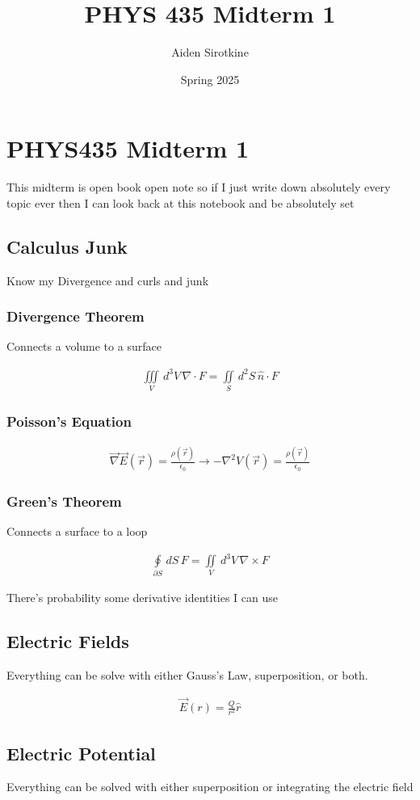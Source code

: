\documentclass[fleqn]{report}
\date{Spring 2025}
\title{PHYS 435 Midterm 1}
\author{Aiden Sirotkine}
\newcommand{\del}{\partial}
\newcommand{\equations} [1] {
\begin{gather*}
#1
\end{gather*}
}
\begin{document}
\pagestyle{fancy}
\maketitle
\tableofcontents
\clearpage

\chapter{PHYS435 Midterm 1}
This midterm is open book open note so if I just write down 
absolutely every topic ever then I can look back at this notebook 
and be absolutely set 

\section{Calculus Junk}
Know my Divergence and curls and junk 

\subsection{Divergence Theorem}
Connects a volume to a surface 
\equations{
    \iiint\limits_V \, d^3 V \, 
    \nabla \cdot F 
    =
    \iint\limits_{S} \, d^2 S \, 
    \hat n \cdot F
}

\subsection{Poisson's Equation}
\equations{
    \vec \nabla \vec E(\vec r) = \frac{\rho(\vec r)}{\epsilon_0}
    \rightarrow
    -\nabla^2 V(\vec r) = \frac{\rho(\vec r)}{\epsilon_0}
}

\subsection{Green's Theorem}
Connects a surface to a loop
\equations{
    \oint\limits_{\del S} \, dS \,
    F
    =
    \iint\limits_V \, d^3 V \, 
    \nabla \times 
    F
}

There's probability some derivative identities I can use

\section{Electric Fields}
Everything can be solve with either Gauss's Law, superposition, or both. 

\equations{
    \vec E(r)
    =
    \frac{Q}{r^2} \hat r 
}

\section{Electric Potential}
Everything can be solved with either superposition or integrating the electric field 
\end{document}
